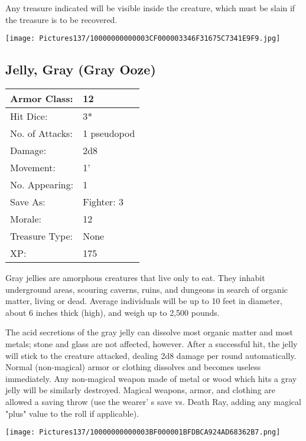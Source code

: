 \documentclass[a4paper,twoside,openany,10pt]{book}
\begin{document}
\begin{multicols}{2}
Any treasure indicated will be visible inside the creature, which must be slain if the treasure is to be recovered.

\begin{center} \texttt{[image: Pictures137/10000000000003CF000003346F31675C7341E9F9.jpg]} \end{center}


\subsection*{Jelly, Gray (Gray Ooze)}\label{jelly-gray-gray-ooze}

\begin{tabularx}{0.50\textwidth}{@{}lX@{}}
Armor Class: & 12 \\\hline
Hit Dice: & 3*  \\\hline
No. of Attacks: & 1 pseudopod \\\hline
Damage: & 2d8 \\\hline
Movement: & 1' \\\hline
No. Appearing: & 1 \\\hline
Save As: & Fighter: 3 \\\hline
Morale: & 12 \\\hline
Treasure Type: & None \\\hline
XP: & 175 \\\hline
\end{tabularx}\medskip

Gray jellies are amorphous creatures that live only to eat. They inhabit underground areas, scouring caverns, ruins, and dungeons in search of organic matter, living or dead. Average individuals will be up to 10 feet in diameter, about 6 inches thick (high), and weigh up to 2,500 pounds.

The acid secretions of the gray jelly can dissolve most organic matter and most metals; stone and glass are not affected, however. After a successful hit, the jelly will stick to the creature attacked, dealing 2d8 damage per round automatically. Normal (non-magical) armor or clothing dissolves and becomes useless immediately. Any non-magical weapon made of metal or wood which hits a gray jelly will be similarly destroyed. Magical weapons, armor, and clothing are allowed a saving throw (use the wearer' s save vs. Death Ray, adding any magical "plus" value to the roll if applicable).

\begin{center} \texttt{[image: Pictures137/10000000000003BF000001BFDBCA924AD68362B7.png]} \end{center}



\end{multicols}
\end{document}
